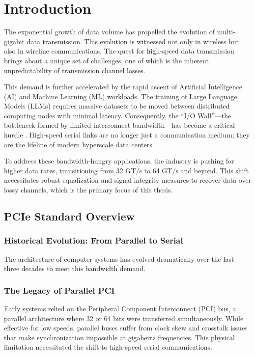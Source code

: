 \chapter{Introduction}
\label{Chapter1}

The exponential growth of data volume has propelled the evolution of multi-gigabit data transmission. This evolution is witnessed not only in wireless but also in wireline communications. The quest for high-speed data transmission brings about a unique set of challenges, one of which is the inherent unpredictability of transmission channel losses.

This demand is further accelerated by the rapid ascent of Artificial Intelligence (AI) and Machine Learning (ML) workloads. The training of Large Language Models (LLMs) requires massive datasets to be moved between distributed computing nodes with minimal latency. Consequently, the ``I/O Wall''—the bottleneck formed by limited interconnect bandwidth—has become a critical hurdle \cite{9269409}. High-speed serial links are no longer just a communication medium; they are the lifeline of modern hyperscale data centers.

To address these bandwidth-hungry applications, the industry is pushing for higher data rates, transitioning from 32 GT/s to 64 GT/s and beyond. This shift necessitates robust equalization and signal integrity measures to recover data over lossy channels, which is the primary focus of this thesis.

\section{PCIe Standard Overview}

\subsection{Historical Evolution: From Parallel to Serial}
The architecture of computer systems has evolved dramatically over the last three decades to meet this bandwidth demand.

\subsection{The Legacy of Parallel PCI}
Early systems relied on the Peripheral Component Interconnect (PCI) bus, a parallel architecture where 32 or 64 bits were transferred simultaneously. While effective for low speeds, parallel buses suffer from clock skew and crosstalk issues that make synchronization impossible at gigahertz frequencies. This physical limitation necessitated the shift to high-speed serial communications.

